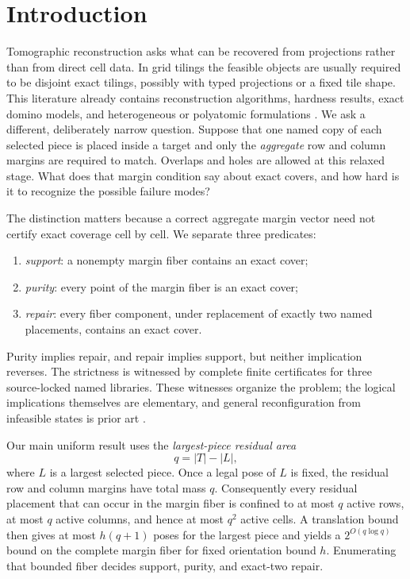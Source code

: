 \section{Introduction}\label{sec:introduction}

Tomographic reconstruction asks what can be recovered from projections rather
than from direct cell data.  In grid tilings the feasible objects are usually
required to be disjoint exact tilings, possibly with typed projections or a
fixed tile shape.  This literature already contains reconstruction
algorithms, hardness results, exact domino models, and heterogeneous or
polyatomic formulations
\cite{HermanKuba1999,ChrobakEtAl2003,ChrobakDurr2001,DurrEtAl2000,
FrosiniSimi2004,FrosiniSimi2005,GritzmannLangfeld2020,
ChrobakEtAl2012}.  We ask a different, deliberately narrow question.
Suppose that one named copy of each selected piece is placed inside a target
and only the \emph{aggregate} row and column margins are required to match.
Overlaps and holes are allowed at this relaxed stage.  What does that margin
condition say about exact covers, and how hard is it to recognize the
possible failure modes?

The distinction matters because a correct aggregate margin vector need not
certify exact coverage cell by cell.  We separate three predicates:

\begin{enumerate}
  \item \emph{support}: a nonempty margin fiber contains an exact cover;
  \item \emph{purity}: every point of the margin fiber is an exact cover;
  \item \emph{repair}: every fiber component, under replacement of exactly
        two named placements, contains an exact cover.
\end{enumerate}

Purity implies repair, and repair implies support, but neither implication
reverses.  The strictness is witnessed by complete finite certificates for
three source-locked named libraries.  These witnesses organize the problem;
the logical implications themselves are elementary, and general
reconfiguration from infeasible states is prior art
\cite{FellowsEtAl2023}.

Our main uniform result uses the \emph{largest-piece residual area}
\[
  q=|T|-|L|,
\]
where \(L\) is a largest selected piece.  Once a legal pose of \(L\) is
fixed, the residual row and column margins have total mass \(q\).
Consequently every residual placement that can occur in the margin fiber is
confined to at most \(q\) active rows, at most \(q\) active columns, and
hence at most \(q^2\) active cells.  A translation bound then gives at most
\(h(q+1)\) poses for the largest piece and yields a
\(2^{O(q\log q)}\) bound on the complete margin fiber for fixed orientation
bound \(h\).  Enumerating that bounded fiber decides support, purity, and
exact-two repair.

